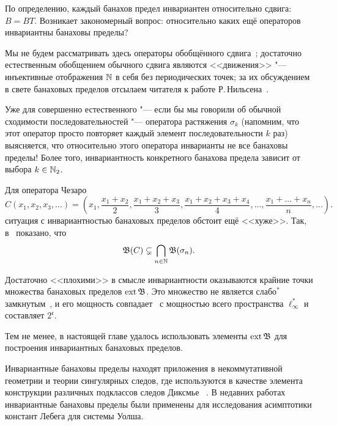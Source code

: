 По определению, каждый банахов предел инвариантен относительно сдвига: $B=BT$.
Возникает закономерный вопрос: относительно каких ещё операторов инвариантны банаховы пределы?

Мы не будем рассматривать здесь операторы обобщённого сдвига~\cite{marchenko2006generalized,lewitan1945normed};
достаточно естественным обобщением обычного сдвига являются <<движения>> "--- инъективные отображения $\mathbb{N}$ в себя без периодических точек; за их обсуждением в свете банаховых пределов отсылаем читателя к работе Р.\,Нильсена~\cite{Nillsen}.

Уже для совершенно естественного "--- если бы мы говорили об обычной сходимости последовательностей "---
оператора растяжения $\sigma_k$
(напомним, что этот оператор просто повторяет каждый элемент последовательности $k$ раз)
выясняется, что относительно этого оператора инварианты не все банаховы пределы!
Более того, инвариантность конкретного банахова предела зависит от выбора $k\in\mathbb{N}_2$.

Для оператора Чезаро
\begin{equation}
	C (x_1, x_2, x_3, ...) = \left(
	x_1,
	\dfrac{x_1+x_2}2,
	\dfrac{x_1+x_2 + x_3}3,
	\dfrac{x_1+x_2+x_3+x_4}4,
	...,
	\dfrac{x_1+...+x_n}n,
	...\right)
	.
\end{equation}
ситуация с инвариантностью банаховых пределов обстоит ещё <<хуже>>.
Так, в~\cite{TODO} показано, что
\begin{equation}
	\mathfrak{B}(C) \subsetneq \bigcap_{n\in \mathbb{N}}\mathfrak{B}(\sigma_n)
	.
\end{equation}




Достаточно <<плохими>> в смысле инвариантности оказываются крайние точки множества банаховых пределов $\operatorname{ext} \mathfrak{B}$.
Это множество не является слабо$^*$ замкнутым~\cite{Nillsen,Talagrand},
и его мощность совпадает~\cite{Chou} с мощностью всего пространства $\ell_\infty^*$
и составляет $2^{\mathfrak c}$.


Тем не менее, в настоящей главе удалось использовать элементы $\operatorname{ext}\mathfrak{B}$ для построения инвариантных банаховых пределов.


Инвариантные банаховы пределы находят приложения в некоммутативной геометрии
и теории сингулярных следов, где используются в качестве элемента конструкции
различных подклассов следов Диксмье
~\cite{carey2003spectral,lord2012singular,sukochev2015characterization,sukochev2016dixmier}.
В недавних работах~\cite{astashkin2015constants_rus_DAN,astashkin2016constants_rus_SMJ} инвариантные банаховы пределы были применены для исследования
асимптотики констант Лебега для системы Уолша.

